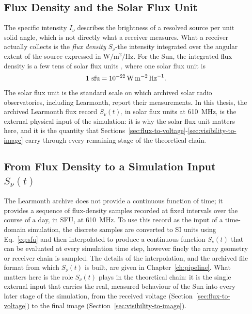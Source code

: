 \subsection{Flux Density and the Solar Flux Unit}
\label{subsec:flux-sfu}
The specific intensity $I_\nu$ describes the brightness of a resolved source
per unit solid angle, which is not directly what a receiver measures. What a
receiver actually collects is the \emph{flux density} $S_\nu$-the intensity
integrated over the angular extent of the source-expressed in
$\si{\watt\per\square\metre\per\hertz}$. For the Sun, the integrated flux
density is a few tens of solar flux units \citep{dulk1985,kundu1965}, where
one solar flux unit is
\begin{equation}
  1~\mathrm{sfu} = \SI{e-22}{\watt\per\square\metre\per\hertz}.
  \label{eq:sfu}
\end{equation}
The solar flux unit is the standard scale on which archived solar radio
observatories, including Learmonth, report their measurements. In this
thesis, the archived Learmonth flux record $S_\nu(t)$, in solar flux units at
\SI{610}{\mega\hertz}, is the external physical input of the simulation: it
is why the solar flux unit matters here, and it is the quantity that
Sections~\ref{sec:flux-to-voltage}-\ref{sec:visibility-to-image} carry through
every remaining stage of the theoretical chain.

\subsection{From Flux Density to a Simulation Input \texorpdfstring{$S_\nu(t)$}{Sν(t)}}
\label{subsec:sv-of-t}
The Learmonth archive does not provide a continuous function of time; it
provides a sequence of flux-density samples recorded at fixed intervals over
the course of a day, in SFU, at \SI{610}{\mega\hertz}. To use this record as
the input of a time-domain simulation, the discrete samples are converted to
SI units using Eq.~\eqref{eq:sfu} and then interpolated to produce a
continuous function $S_\nu(t)$ that can be evaluated at every simulation time
step, however finely the array geometry or receiver chain is sampled. The
details of the interpolation, and the archived file format from which
$S_\nu(t)$ is built, are given in Chapter~\ref{ch:pipeline}. What matters here
is the role $S_\nu(t)$ plays in the theoretical chain: it is the single
external input that carries the real, measured behaviour of the Sun into
every later stage of the simulation, from the received voltage
(Section~\ref{sec:flux-to-voltage}) to the final image
(Section~\ref{sec:visibility-to-image}).

